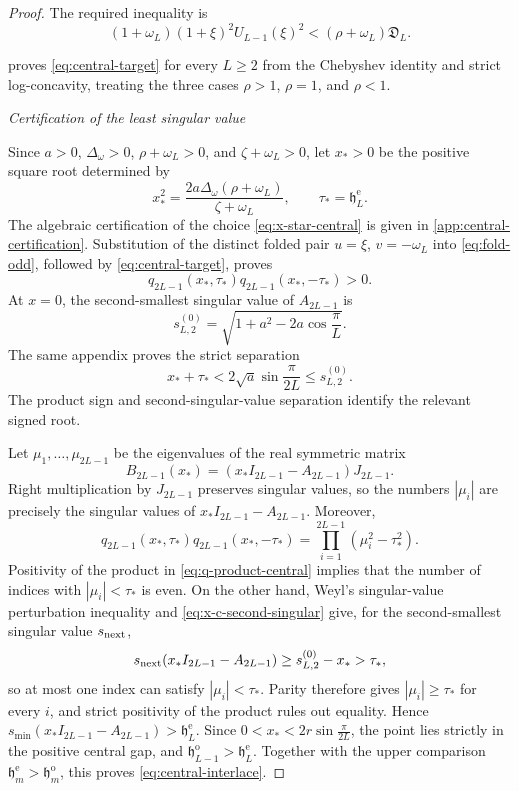 \documentclass[11pt,a4paper]{article}
\numberwithin{equation}{section}
\newcommand{\proofstage}[1]{%
  \par\medskip\noindent\textit{#1}\par\nobreak\smallskip}
\begin{document}
\begin{proof}
The required inequality is
\begin{equation}\label{eq:central-target}
 (1+\omega_L)(1+\xi)^2U_{L-1}(\xi)^2
 <(\rho+\omega_L)\mathfrak D_L.
\end{equation}

 proves \eqref{eq:central-target} for every
\(L\geq2\) from the Chebyshev identity and strict log-concavity, treating
the three cases \(\rho>1\), \(\rho=1\), and \(\rho<1\).

\proofstage{Certification of the least singular value}
Since \(a>0\), \(\Delta_\omega>0\), \(\rho+\omega_L>0\), and
\(\zeta+\omega_L>0\), let \(x_*>0\) be the positive square root determined
by
\begin{equation}\label{eq:x-star-central}
 x_*^2=\frac{2a\Delta_\omega(\rho+\omega_L)}{\zeta+\omega_L},
 \qquad \tau_*=\mathfrak h_L^{\mathrm e}.
\end{equation}
The algebraic certification of the choice \eqref{eq:x-star-central} is given in
\cref{app:central-certification}.  Substitution of the distinct folded pair
\(u=\xi\), \(v=-\omega_L\) into \eqref{eq:fold-odd}, followed by
\eqref{eq:central-target}, proves
\begin{equation}\label{eq:q-product-central}
 q_{2L-1}(x_*,\tau_*)q_{2L-1}(x_*,-\tau_*)>0.
\end{equation}
At \(x=0\), the second-smallest singular value of \(A_{2L-1}\) is
\[
 s_{L,2}^{(0)}
 =\sqrt{1+a^2-2a\cos\frac{\pi}{L}}.
\]
The same appendix proves the strict separation
\begin{equation}\label{eq:x-c-second-singular}
 x_*+\tau_*<2\sqrt a\sin\frac{\pi}{2L}\leq s_{L,2}^{(0)}.
\end{equation}
The product sign and second-singular-value separation identify the relevant
signed root.

Let \(\mu_1,\ldots,\mu_{2L-1}\) be the eigenvalues of the real symmetric
matrix
\[
 B_{2L-1}(x_*)=(x_*I_{2L-1}-A_{2L-1})J_{2L-1}.
\]
Right multiplication by \(J_{2L-1}\) preserves singular values, so the
numbers \(|\mu_i|\) are precisely the singular values of
\(x_*I_{2L-1}-A_{2L-1}\).  Moreover,
\[
 q_{2L-1}(x_*,\tau_*)q_{2L-1}(x_*,-\tau_*)
 =\prod_{i=1}^{2L-1}(\mu_i^2-\tau_*^2).
\]
Positivity of the product in \eqref{eq:q-product-central} implies that the
number of indices with \(|\mu_i|<\tau_*\) is even.  On the other hand, Weyl's
singular-value perturbation inequality and
\eqref{eq:x-c-second-singular} give, for the second-smallest singular value
\(s_{\rm next}\),
\[
 s_{\rm next}(x_*I_{2L-1}-A_{2L-1})
 \geq s_{L,2}^{(0)}-x_*>\tau_*,
\]
so at most one index can satisfy \(|\mu_i|<\tau_*\).  Parity therefore gives
\(|\mu_i|\geq\tau_*\) for every \(i\), and strict positivity of the product
rules out equality.  Hence
\(s_{\min}(x_*I_{2L-1}-A_{2L-1})>\mathfrak h_L^{\mathrm e}\).  Since
\(0<x_*<2r\sin\frac{\pi}{2L}\), the point lies strictly in the positive
central gap, and
\(\mathfrak h_{L-1}^{\mathrm o}>\mathfrak h_L^{\mathrm e}\).  Together
with the upper comparison
\(\mathfrak h_m^{\mathrm e}>\mathfrak h_m^{\mathrm o}\), this proves
\eqref{eq:central-interlace}.
\end{proof}
\end{document}
